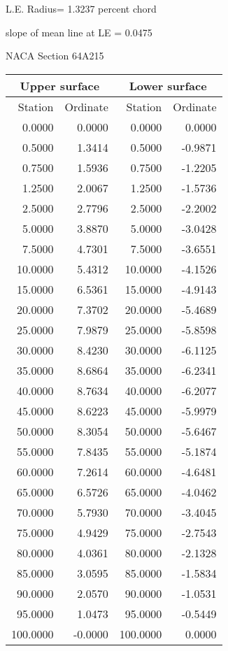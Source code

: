 \documentclass[11pt]{book}
\begin{document}
L.E. Radius=  1.3237 percent chord


 slope of mean line at LE =  0.0475
 \newpage
  \label{s64A215}
 \begin{Large}
 NACA Section 64A215
 \end{Large}
  
 \vspace{8mm}
 \begin{tabular}{|r|r|r|r|} \hline 
 \multicolumn{2}{|c|}{Upper surface} & \multicolumn{2}{|c|}{Lower surface} \\
 \hline
 Station & Ordinate & Station & Ordinate \\
 \hline
0.0000 & 0.0000 & 0.0000 & 0.0000 \\
0.5000 & 1.3414 & 0.5000 & -0.9871 \\
0.7500 & 1.5936 & 0.7500 & -1.2205 \\
1.2500 & 2.0067 & 1.2500 & -1.5736 \\
2.5000 & 2.7796 & 2.5000 & -2.2002 \\
5.0000 & 3.8870 & 5.0000 & -3.0428 \\
7.5000 & 4.7301 & 7.5000 & -3.6551 \\
10.0000 & 5.4312 & 10.0000 & -4.1526 \\
15.0000 & 6.5361 & 15.0000 & -4.9143 \\
20.0000 & 7.3702 & 20.0000 & -5.4689 \\
25.0000 & 7.9879 & 25.0000 & -5.8598 \\
30.0000 & 8.4230 & 30.0000 & -6.1125 \\
35.0000 & 8.6864 & 35.0000 & -6.2341 \\
40.0000 & 8.7634 & 40.0000 & -6.2077 \\
45.0000 & 8.6223 & 45.0000 & -5.9979 \\
50.0000 & 8.3054 & 50.0000 & -5.6467 \\
55.0000 & 7.8435 & 55.0000 & -5.1874 \\
60.0000 & 7.2614 & 60.0000 & -4.6481 \\
65.0000 & 6.5726 & 65.0000 & -4.0462 \\
70.0000 & 5.7930 & 70.0000 & -3.4045 \\
75.0000 & 4.9429 & 75.0000 & -2.7543 \\
80.0000 & 4.0361 & 80.0000 & -2.1328 \\
85.0000 & 3.0595 & 85.0000 & -1.5834 \\
90.0000 & 2.0570 & 90.0000 & -1.0531 \\
95.0000 & 1.0473 & 95.0000 & -0.5449 \\
100.0000 & -0.0000 & 100.0000 & 0.0000 \\
 \hline 
 \end{tabular}
\end{document}
